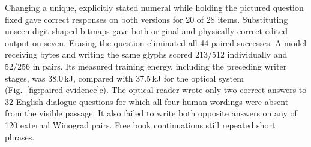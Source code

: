 \documentclass[12pt,a4paper]{article}
\providecommand{\DIFadd}[1]{{\protect\color{blue} \sf #1}} %
\begin{document}
\DIFadd{Changing a unique, explicitly stated numeral while holding the pictured question fixed gave correct responses on both versions for 20 of 28 items. Substituting unseen digit-shaped bitmaps gave both original and physically correct edited output on seven. Erasing the question eliminated all 44 paired successes. A model receiving bytes and writing the same glyphs scored 213/512 individually and 52/256 in pairs. Its measured training energy, including the preceding writer stages, was 38.0\,kJ, compared with 37.5\,kJ for the optical system (Fig.~\ref{fig:paired-evidence}c). The optical reader wrote only two correct answers to 32 English dialogue questions for which all four human wordings were absent from the visible passage. It also failed to write both opposite answers on any of 120 external Winograd pairs. Free book continuations still repeated short phrases.
}
\end{document}
